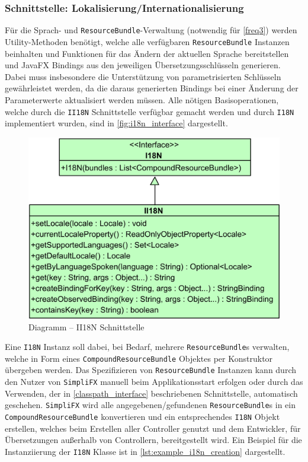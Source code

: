 \subsubsection{Schnittstelle: Lokalisierung/Internationalisierung}
Für die Sprach- und \texttt{ResourceBundle}-Verwaltung (notwendig für \autoref{freq3}) werden Utility-Methoden benötigt, welche alle verfügbaren \texttt{ResourceBundle} Instanzen beinhalten und Funktionen für das Ändern der aktuellen Sprache bereitstellen und JavaFX Bindings aus den jeweiligen Übersetzungsschlüsseln generieren. Dabei muss insbesondere die Unterstützung von parametrisierten Schlüsseln gewährleistet werden, da die daraus generierten Bindings bei einer Änderung der Parameterwerte aktualisiert werden müssen. Alle nötigen Basisoperationen, welche durch die \texttt{II18N} Schnittstelle verfügbar gemacht werden und durch \texttt{I18N} implementiert wurden, sind in \autoref{fig:i18n_interface} dargestellt.
\begin{figure}[H]
	\centering
	\includegraphics[width=\textwidth-2cm]{Abbildungen/I18N.png}
	\caption{Diagramm -- II18N Schnittstelle}
	\label{fig:i18n_interface}
\end{figure}
\noindent Eine \texttt{I18N} Instanz soll dabei, bei Bedarf, mehrere \texttt{ResourceBundle}s verwalten, welche in Form eines \texttt{CompoundResourceBundle} Objektes per Konstruktor übergeben werden. Das Spezifizieren von \texttt{ResourceBundle} Instanzen kann durch den Nutzer von \texttt{SimpliFX} manuell beim Applikationsstart erfolgen oder durch das Verwenden, der in \autoref{classpath_interface} beschriebenen Schnittstelle, automatisch geschehen. \texttt{SimpliFX} wird alle angegebenen/gefundenen \texttt{ResourceBundle}s in ein \texttt{CompoundResourceBundle} konvertieren und ein entsprechendes \texttt{I18N} Objekt erstellen, welches beim Erstellen aller Controller genutzt und dem Entwickler, für Übersetzungen außerhalb von Controllern, bereitgestellt wird. Ein Beispiel für die Instanziierung der \texttt{I18N} Klasse ist in \autoref{lst:example_i18n_creation} dargestellt.
